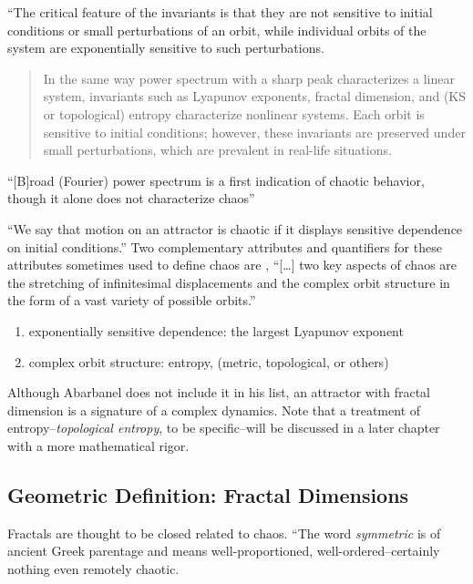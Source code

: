 \documentclass[12pt,twoside,draft]{book}
\begin{document}
``The critical feature of the invariants is that they are not sensitive to initial conditions
or small perturbations of an orbit, while individual orbits of the system are exponentially
sensitive to such perturbations. \citep[p.1334]{abarbanel}
\begin{quote}
  In the same way power spectrum with a sharp peak characterizes a linear system, invariants such as Lyapunov exponents, fractal dimension, and (KS or topological) entropy characterize nonlinear systems.
  Each orbit is sensitive to initial conditions; however, these invariants are preserved under small perturbations, which are prevalent in real-life situations.
\end{quote}

``[B]road (Fourier) power spectrum is a first indication of chaotic behavior, though it alone does not characterize chaos''\citep[p.1338]{abarbanel}

``We say that motion on an attractor is chaotic if it displays sensitive dependence on initial conditions.'' \citep[p.11]{ott1994}
Two complementary attributes and quantifiers for these attributes sometimes used to define chaos are \citep[p.379]{abarbanel}, %
``[\ldots] two key aspects of chaos are the stretching of infinitesimal displacements and the complex orbit structure in the form of a vast variety of possible orbits.'' \citep[p.31]{ott1994}
\begin{enumerate}
  \item exponentially sensitive dependence: the largest Lyapunov exponent 
  \item complex orbit structure: entropy, (metric, topological, or others)
\end{enumerate}

Although Abarbanel does not include it in his list, an attractor with fractal dimension is a signature of a complex dynamics.
Note that a treatment of entropy--\textit{topological entropy}, to be specific--will be discussed in a later chapter with a more mathematical rigor.

\subsection*{Geometric Definition: Fractal Dimensions}
Fractals are thought to be closed related to chaos.
\citet{schroeder} 
``The word \textit{symmetric} is of ancient Greek parentage and means well-proportioned, well-ordered--certainly nothing even remotely chaotic.
\end{document}
